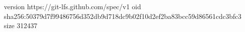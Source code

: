 version https://git-lfs.github.com/spec/v1
oid sha256:50379d7f99486756d352db9d718dc9b02f10d2ef2ba83bcc59d86561cdc3bfc3
size 312437
